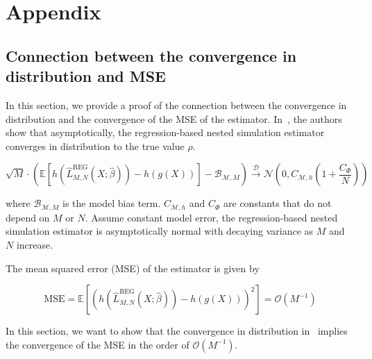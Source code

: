 \chapter*{Appendix} \label{chap:appendix}

\section*{Connection between the convergence in distribution and MSE} \label{sec:appendix1}

In this section, we provide a proof of the connection between the convergence in distribution and the convergence of the MSE of the estimator.
In~\cite{broadie2015risk}, the authors show that asymptotically, the regression-based nested simulation estimator converges in distribution to the true value $\rho$.

\begin{equation}
    \sqrt{M}\cdot \left( \mathbb{E}\left[h(\hat{L}_{M,N}^{\text{REG}}(X; \hat{\beta})) - h\left( g(X) \right) \right] - \mathcal{B}_{\mathcal{M}, M} \right) \overset{\mathcal{D}}{\to} \mathcal{N} \left( 0, C_{\mathcal{M}, h} \left( 1+ \frac{C_{\Phi}}{N} \right) \right)
\end{equation}

where $\mathcal{B}_{\mathcal{M}, M}$ is the model bias term. $C_{\mathcal{M}, h}$ and $C_{\Phi}$ are constants that do not depend on $M$ or $N$.
Assume constant model error, the regression-based nested simulation estimator is asymptotically normal with decaying variance as $M$ and $N$ increase.

The mean squared error (MSE) of the estimator is given by

\begin{equation}
    \text{MSE} = \mathbb{E}\left[ \left( h(\hat{L}_{M,N}^{\text{REG}}(X; \hat{\beta})) - h\left( g(X) \right) \right)^2 \right] = \mathcal{O}(M^{-1})
\end{equation}

In this section, we want to show that the convergence in distribution in~\cite{broadie2015risk} implies the convergence of the MSE in the order of $\mathcal{O}(M^{-1})$.
